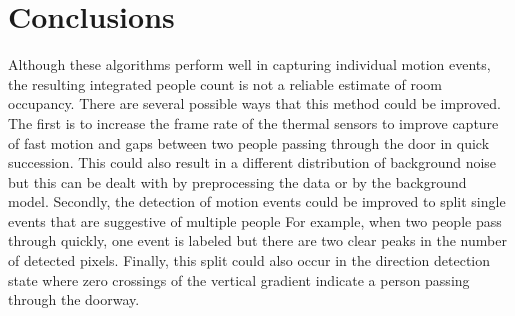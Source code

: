 \documentclass[12pt,oneside]{article} %
\begin{document}
\section{Conclusions} %
Although these algorithms perform well in capturing individual motion events, the resulting integrated people count is 
not a reliable estimate of room occupancy. There are several possible ways that this method could be improved. The
first is to increase the frame rate of the thermal sensors to improve capture of fast motion and gaps between 
two people passing through the door in quick succession. This could also result in a different distribution of 
background noise but this can be dealt with by preprocessing the data or by the background model. Secondly,
the detection of motion events could be improved to split single events that are suggestive of multiple people
For example, when two people pass through quickly, one event is labeled but there are two clear peaks in the
number of detected pixels. Finally, this split could also occur in the direction detection state where zero crossings
of the vertical gradient indicate a person passing through the doorway.


\parskip=0pt
\parsep=0pt
\clearpage



\end{document}

